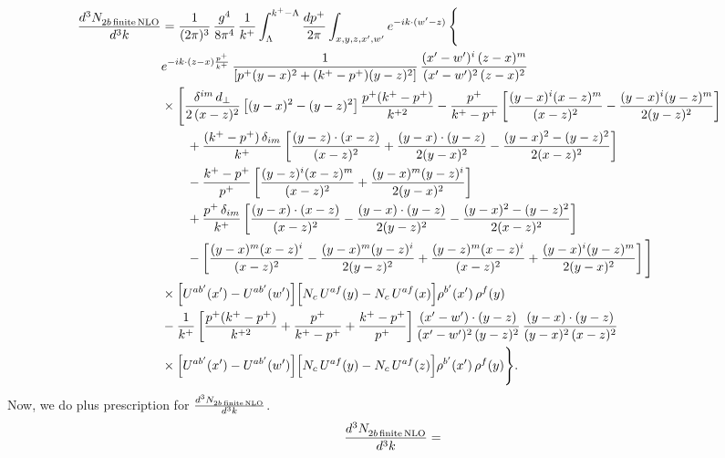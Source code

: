 \documentclass[9pt]{article}
\numberwithin{equation}{section}
\begin{document}
\begin{align}
\frac{d^{3}N_{2b\,\rm finite\, NLO}^{\rm}}{d^{3}k} & = \frac{1}{(2\pi)^{3}}\,\frac{g^{4}}{8\pi^{4}}\,\frac{1}{k^{+}}\int_{\Lambda}^{k^{+}-\Lambda}\frac{dp^{+}}{2\pi}\int_{x,y,z,x',w'}e^{-ik\cdot(w'-z)}\,\Bigg\{\notag\\
&e^{-ik\cdot(z-x)\frac{p^{+}}{k^{+}}}\,\frac{1}{\left[p^{+}(y-x)^{2}+(k^{+}-p^{+})(y-z)^{2}\right]}\,\frac{(x'-w')^{i}\,(z-x)^{m}}{(x'-w')^{2}\,(z-x)^{2}}\notag\\
&\times\Bigg[\frac{\delta^{im}\,d_{\perp}}{2\,(x-z)^{2}}\left[(y-x)^{2}-(y-z)^{2}\right]\frac{p^{+}(k^{+}-p^{+})}{k^{+2}}
-\frac{p^{+}}{k^{+}-p^{+}}\left[\frac{(y-x)^{i}(x-z)^{m}}{(x-z)^{2}}-\frac{(y-x)^{i}(y-z)^{m}}{2(y-z)^{2}}\right]\notag\\
&\qquad+\frac{(k^{+}-p^{+})\,\delta_{im}}{k^{+}}\left[\frac{(y-z)\cdot(x-z)}{(x-z)^{2}}+\frac{(y-x)\cdot(y-z)}{2(y-x)^{2}}-\frac{(y-x)^{2}-(y-z)^{2}}{2(x-z)^{2}}\right]\notag\\
&\qquad-\frac{k^{+}-p^{+}}{p^{+}}\left[\frac{(y-z)^{i}(x-z)^{m}}{(x-z)^{2}}+\frac{(y-x)^{m}(y-z)^{i}}{2(y-x)^{2}}\right]\notag\\
&\qquad+\frac{p^{+}\,\delta_{im}}{k^{+}}\left[\frac{(y-x)\cdot(x-z)}{(x-z)^{2}}-\frac{(y-x)\cdot(y-z)}{2(y-z)^{2}}-\frac{(y-x)^{2}-(y-z)^{2}}{2(x-z)^{2}}\right]\notag\\
&\qquad-\left[\frac{(y-x)^{m}(x-z)^{i}}{(x-z)^{2}}-\frac{(y-x)^{m}(y-z)^{i}}{2(y-z)^{2}}+\frac{(y-z)^{m}(x-z)^{i}}{(x-z)^{2}}+\frac{(y-x)^{i}(y-z)^{m}}{2(y-x)^{2}}\right]\Bigg]\notag\\
&\times\Big[U^{ab'}(x')-U^{ab'}(w')\Big]\Big[N_{c}\,U^{af}(y)-N_{c}\,U^{af}(x)\Big]\rho^{b'}(x')\,\rho^{f}(y)\notag\\
&-\frac{1}{k^{+}}\left[\frac{p^{+}(k^{+}-p^{+})}{k^{+2}}+\frac{p^{+}}{k^{+}-p^{+}}+\frac{k^{+}-p^{+}}{p^{+}}\right]
\frac{(x'-w')\cdot(y-z)}{(x'-w')^{2}\,(y-z)^{2}}\,\frac{(y-x)\cdot(y-z)}{(y-x)^{2}\,(x-z)^{2}}\notag\\
&\times\Big[U^{ab'}(x')-U^{ab'}(w')\Big]\Big[N_{c}\,U^{af}(y)-N_{c}\,U^{af}(z)\Big]\rho^{b'}(x')\,\rho^{f}(y)\Bigg\}.
\end{align}
Now, we do plus prescription for $\frac{d^{3}N_{2b\,\rm finite\, NLO}^{\rm}}{d^{3}k}$. 
\begin{align}
    \frac{d^{3}N_{2b\,\rm finite\, NLO}^{\rm}}{d^{3}k} & = 
\end{align}
\end{document}
